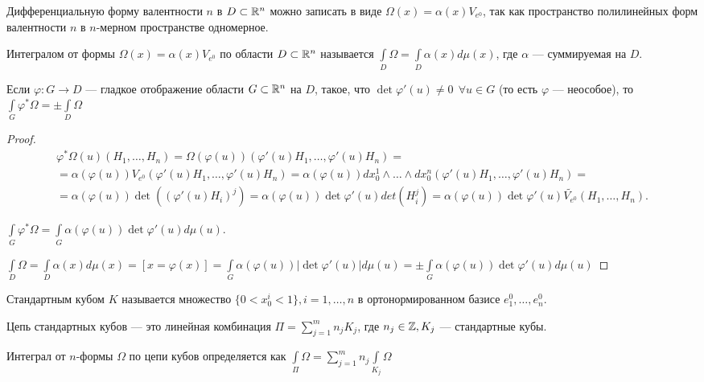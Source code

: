 Дифференциальную форму валентности $n$ в $D\subset\R^n$ можно записать в виде $\Omega(x)=\alpha(x)V_{e^0}$, так как пространство полилинейных форм валентности $n$ в $n$-мерном пространстве одномерное.

\begin{Def}
	Интегралом от формы $\Omega(x)=\alpha(x)V_{e^0}$ по области $D\subset\R^n$ называется $\int\limits_{D}\Omega=\int\limits_{D}\alpha(x)d\mu(x)$, где $\alpha$ --- суммируемая на $D$.
\end{Def}

\begin{prop}
	Если $\varphi:G\to D$ --- гладкое отображение области $G\subset \R^n$ на $D$, такое, что $\det \varphi'(u)\ne 0\ \ \forall u\in G$ (то есть $\varphi$ --- неособое), то $\int\limits_{G}\varphi^*\Omega=\pm\int\limits_{D}\Omega$
\end{prop}

\begin{proof}
	\begin{multline*}
		\varphi^*\Omega(u)(H_1,\ldots, H_n)=\Omega(\varphi(u))(\varphi'(u)H_1, \ldots, \varphi'(u)H_n)=\\=\alpha(\varphi(u))V_{e^0}(\varphi'(u)H_1, \ldots, \varphi'(u)H_n)=\alpha(\varphi(u))dx_0^1\wedge\ldots\wedge dx^n_0(\varphi'(u)H_1, \ldots, \varphi'(u)H_n)=\\=\alpha(\varphi(u))\det((\varphi'(u)H_i)^j)=\alpha(\varphi(u))\det\varphi'(u)det(H^j_i)=\alpha(\varphi(u))\det\varphi'(u)\widetilde{V_{e^0}}(H_1,\ldots,H_n).
	\end{multline*}
	
	$\int\limits_{G}\varphi^*\Omega=\int\limits_{G}\alpha(\varphi(u))\det\varphi'(u)d\mu(u)$.
	
	$\int\limits_{D}\Omega=\int\limits_{D}\alpha(x)d\mu(x)=[x=\varphi(x)]=\int\limits_{G}\alpha(\varphi(u))|\det\varphi'(u)|d\mu(u)=\pm\int\limits_{G}\alpha(\varphi(u))\det\varphi'(u)d\mu(u)$
\end{proof}

\begin{Def}
	Стандартным кубом $K$ называется множество $\{0<x^i_0<1\},i=1,\ldots,n$ в ортонормированном базисе $e^0_1,\ldots,e_n^0$.
	
	Цепь стандартных кубов --- это линейная комбинация $\Pi=\sum\limits_{j=1}^mn_jK_j$, где $n_j\in \Z, K_j$ --- стандартные кубы.
\end{Def}

\begin{Def}
	Интеграл от $n$-формы $\Omega$ по цепи кубов определяется как $\int\limits_{\Pi}\Omega=\sum\limits_{j=1}^m n_j\int\limits_{K_j}\Omega$
\end{Def}

